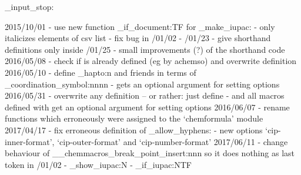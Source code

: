 \file_input_stop:

2015/10/01 - use new function \chemmacros_if_document:TF for
             \chemmacros_make_iupac:
           - \cip only italicizes elements of csv list
           - fix bug in /01/02 - /01/23 - give shorthand definitions only inside /01/25 - small improvements (?) of the shorthand code
2016/05/08 - check if \latin is already defined (eg by achemso) and overwrite
             definition
2016/05/10 - define \chemmacros_hapto:n and friends in terms of
             \chemmacros_coordination_symbol:nnnn
           - \iupac gets an optional argument for setting options
2016/05/31 - overwrite any \latin definition -- or rather: just define \latin
           - \latin and all macros defined with \NewChemLatin get an optional
             argument for setting options
2016/06/07 - rename functions which erroneously were assigned to the
             `chemformula' module
2017/04/17 - fix erroneous definition of \chemmacros_allow_hyphens:
           - new options `cip-inner-format', `cip-outer-format' and
             `cip-number-format'
2017/06/11 - change behaviour of \__chemmacros_break_point_insert:nnn so
             it does nothing as last token in /01/02 - \chemmacros_show_iupac:N
           - \chemmacros_if_iupac:NTF
